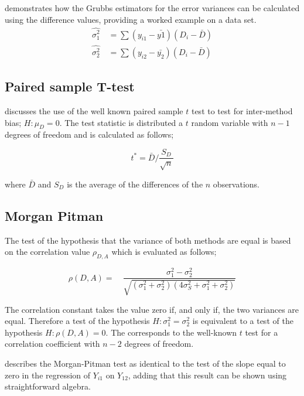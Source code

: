 \documentclass[12pt, a4paper]{report}
\theoremstyle{plain}
\theoremstyle{definition}
\theoremstyle{remark}
\begin{document}
\citet{Kinsella} demonstrates how the Grubbs estimators for the
error variances can be calculated using the difference values,
providing a worked example on a data set.
\begin{eqnarray}
\hat{\sigma^{2}_{1}}
\quad=\sum{(y_{i1}-\bar{y{1}})(D_{i}-\bar{D})}\\
\hat{\sigma^{2}_{2}} \quad=
\sum{(y_{i2}-\bar{y_{2}})(D_{i}-\bar{D})} \nonumber
\end{eqnarray}

\subsection{Paired sample T-test} \citet{Bartko} discusses the use
of the well known paired sample $t$ test to test for inter-method
bias; $H: \mu_{D}=0$. The test statistic is distributed a $t$
random variable with $n-1$ degrees of freedom and is calculated as
follows;

\begin{equation}
t^{*} = \bar{D}/ \frac{S_{D}}{\sqrt{n}}
\end{equation}

where $\bar{D}$ and $S_{D}$ is the average of the differences of
the $n$ observations.

\subsection{Morgan Pitman}

The test of the hypothesis that the variance of both methods are
equal is based on the correlation value $\rho_{D,A}$ which is
evaluated as follows;

\begin{equation}
\rho(D,A)=\quad\frac{\sigma^{2}_{1}-\sigma^{2}_{2}}{\sqrt{(\sigma^{2}_{1}+\sigma^{2}_{2})(4\sigma^{2}_{S}+\sigma^{2}_{1}+\sigma^{2}_{2})}}
\end{equation}

The correlation constant takes the value zero if, and only if, the
two variances are equal. Therefore a test of the hypothesis $H:
\sigma^{2}_{1}=\sigma^{2}_{2}$ is equivalent to a test of the
hypothesis $H: \rho(D,A) = 0$. The corresponds to the well-known
$t$ test for a correlation coefficient with $n-2$ degrees of
freedom.

\citet{Bartko} describes the Morgan-Pitman test as identical to
the test of the slope equal to zero in the regression of $Y_{i1}$
on $Y_{12}$, adding that this result can be shown using
straightforward algebra.
\end{document}
